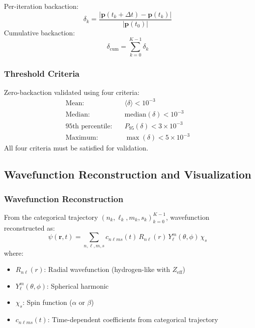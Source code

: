 \documentclass[twocolumn,10pt]{article}
\begin{document}
Per-iteration backaction:
%
\begin{equation}
\delta_k = \frac{|\mathbf{p}(t_k + \Delta t) - \mathbf{p}(t_k)|}{|\mathbf{p}(t_0)|}
\label{eq:backaction_per_iteration}
\end{equation}
%
Cumulative backaction:
%
\begin{equation}
\delta_{\text{cum}} = \sum_{k=0}^{K-1} \delta_k
\label{eq:backaction_cumulative}
\end{equation}

\subsubsection{Threshold Criteria}

Zero-backaction validated using four criteria:
%
\begin{align}
\text{Mean:} \quad & \langle \delta \rangle < 10^{-3} \label{eq:threshold_mean} \\
\text{Median:} \quad & \text{median}(\delta) < 10^{-3} \label{eq:threshold_median} \\
\text{95th percentile:} \quad & P_{95}(\delta) < 3 \times 10^{-3} \label{eq:threshold_p95} \\
\text{Maximum:} \quad & \max(\delta) < 5 \times 10^{-3} \label{eq:threshold_max}
\end{align}
%
All four criteria must be satisfied for validation.

\subsection{Wavefunction Reconstruction and Visualization}

\subsubsection{Wavefunction Reconstruction}

From the categorical trajectory $(n_k, \ell_k, m_k, s_k)_{k=0}^{K-1}$, 
wavefunction reconstructed as:
%
\begin{equation}
\psi(\mathbf{r}, t) = \sum_{n,\ell,m,s} c_{n\ell ms}(t) \, R_{n\ell}(r) \, Y_\ell^m(\theta, \phi) \, \chi_s
\label{eq:wavefunction_reconstruction}
\end{equation}
%
where:
\begin{itemize}
\item $R_{n\ell}(r)$: Radial wavefunction (hydrogen-like with $Z_{\text{eff}}$)
\item $Y_\ell^m(\theta, \phi)$: Spherical harmonic
\item $\chi_s$: Spin function ($\alpha$ or $\beta$)
\item $c_{n\ell ms}(t)$: Time-dependent coefficients from categorical trajectory
\end{itemize}
\end{document}
